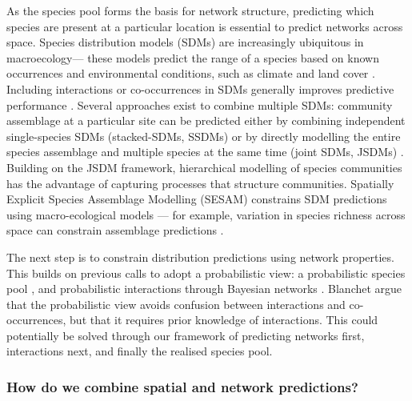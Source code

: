 As the species pool forms the basis for network structure, predicting
which species are present at a particular location is essential to
predict networks across space. Species distribution models (SDMs) are
increasingly ubiquitous in macroecology--- these models predict the
range of a species based on known occurrences and environmental
conditions, such as climate and land cover \cite{Guisan2005PreSpe,
Elith2006NovMet}. Including interactions or co-occurrences in SDMs
generally improves predictive performance \cite{Wisz2013RolBio}. Several
approaches exist to combine multiple SDMs: community assemblage at a
particular site can be predicted either by combining independent
single-species SDMs (stacked-SDMs, SSDMs) or by directly modelling the
entire species assemblage and multiple species at the same time (joint
SDMs, JSDMs) \cite{Norberg2019ComEva}. Building on the JSDM framework,
hierarchical modelling of species communities
\cite{Ovaskainen2017HowMak} has the advantage of capturing processes
that structure communities. Spatially Explicit Species Assemblage
Modelling (SESAM) constrains SDM predictions using macro-ecological
models \cite{Guisan2011SesNew} --- for example, variation in species
richness across space can constrain assemblage predictions
\cite{DAmen2015UsiSpe}.

The next step is to constrain distribution predictions using network
properties. This builds on previous calls to adopt a probabilistic view:
a probabilistic species pool \cite{Karger2016DelPro}, and probabilistic
interactions through Bayesian networks \cite{Staniczenko2017LinMac}.
Blanchet\cite{Blanchet2020CooNot} argue that the probabilistic view avoids confusion
between interactions and co-occurrences, but that it requires prior
knowledge of interactions. This could potentially be solved through our
framework of predicting networks first, interactions next, and finally
the realised species pool.

\subsubsection{How do we combine spatial and network
predictions?}\label{how-do-we-combine-spatial-and-network-predictions}

